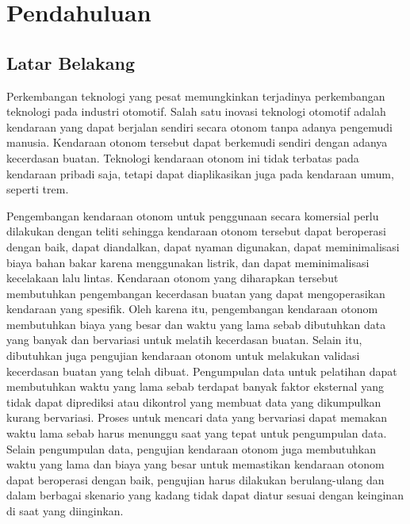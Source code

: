 \chapter{Pendahuluan}



\section{Latar Belakang}

Perkembangan teknologi yang pesat memungkinkan terjadinya perkembangan teknologi
pada industri otomotif. Salah satu inovasi teknologi otomotif adalah kendaraan
yang dapat berjalan sendiri secara otonom tanpa adanya pengemudi manusia.
Kendaraan otonom tersebut dapat berkemudi sendiri dengan adanya kecerdasan
buatan. Teknologi kendaraan otonom ini tidak terbatas pada kendaraan pribadi
saja, tetapi dapat diaplikasikan juga pada kendaraan umum, seperti trem.

Pengembangan kendaraan otonom untuk penggunaan secara komersial perlu dilakukan
dengan teliti sehingga kendaraan otonom tersebut dapat beroperasi dengan baik,
dapat diandalkan, dapat nyaman digunakan, dapat meminimalisasi biaya bahan bakar
karena menggunakan listrik, dan dapat meminimalisasi kecelakaan lalu lintas.
Kendaraan otonom yang diharapkan tersebut membutuhkan pengembangan kecerdasan
buatan yang dapat mengoperasikan kendaraan yang spesifik. Oleh karena itu,
pengembangan kendaraan otonom membutuhkan biaya yang besar dan waktu yang lama
sebab dibutuhkan data yang banyak dan bervariasi untuk melatih kecerdasan
buatan. Selain itu, dibutuhkan juga pengujian kendaraan otonom untuk melakukan
validasi kecerdasan buatan yang telah dibuat. Pengumpulan data untuk pelatihan
dapat membutuhkan waktu yang lama sebab terdapat banyak faktor eksternal yang
tidak dapat diprediksi atau dikontrol yang membuat data yang dikumpulkan kurang
bervariasi. Proses untuk mencari data yang bervariasi dapat memakan waktu lama
sebab harus menunggu saat yang tepat untuk pengumpulan data. Selain pengumpulan
data, pengujian kendaraan otonom juga membutuhkan waktu yang lama dan biaya yang
besar untuk memastikan kendaraan otonom dapat beroperasi dengan baik, pengujian
harus dilakukan berulang-ulang dan dalam berbagai skenario yang kadang tidak
dapat diatur sesuai dengan keinginan di saat yang diinginkan.

